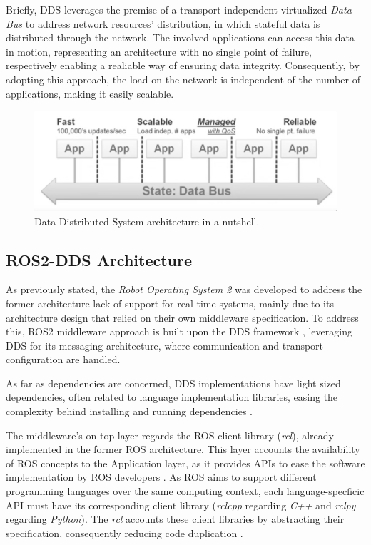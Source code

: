 Briefly, DDS leverages the premise of a transport-independent virtualized \textit{Data Bus} to address network resources' distribution, in which stateful data is distributed through the network. The involved applications can access this data in motion, representing an architecture with no single point of failure, respectively enabling a realiable way of ensuring data integrity. Consequently, by adopting this approach, the load on the network is independent of the number of applications, making it easily scalable.

\begin{figure}[H]
    \centering
    \includegraphics[width=0.6\linewidth]{images/dds-architecture.png}
    \caption{Data Distributed System architecture in a nutshell.}
    \label{fig:dds-architecture-nutshell}
\end{figure}


\subsection{ROS2-DDS Architecture}

As previously stated, the \textit{Robot Operating System 2} was developed to address the former architecture lack of support for real-time systems, mainly due to its architecture design that relied on their own middleware specification. To address this, ROS2 middleware approach is built upon the DDS framework \cite{maruyama2016exploring}, leveraging DDS for its messaging architecture, where communication and transport configuration are handled. 

As far as dependencies are concerned, DDS implementations have light sized dependencies, often related to language implementation libraries, easing the complexity behind installing and running dependencies \cite{ros-on-dds}.

The middleware's on-top layer regards the ROS client library (\textit{rcl}), already implemented in the former ROS architecture. This layer accounts the availability of ROS concepts to the Application layer, as it provides APIs to ease the software implementation by ROS developers \cite{ros2documentation}. As ROS aims to support different programming languages over the same computing context, each language-specficic API must have its corresponding client library (\textit{rclcpp} regarding \textit{C++} and \textit{rclpy} regarding \textit{Python}). The \textit{rcl} accounts these client libraries by abstracting their specification, consequently reducing code duplication \cite{rcl, casini2019response}.

